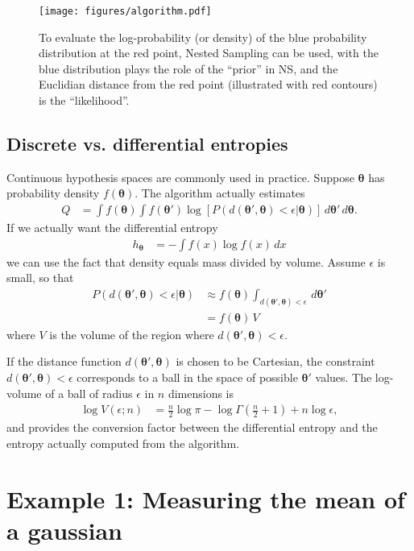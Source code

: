 \documentclass[entropy,article,accept,oneauthor,pdftex,10pt,a4paper]{mdpi}
\newcommand{\x}{\boldsymbol{\theta}}
\begin{document}
\begin{figure}[!ht]
\centering
\texttt{[image: figures/algorithm.pdf]}
\caption{To evaluate the log-probability (or density) of the blue
probability distribution at the red point, Nested Sampling can be used,
with the blue distribution plays the role of the ``prior'' in NS, and the
Euclidian distance from the red point (illustrated with red contours)
is the ``likelihood''.\label{fig:algorithm}}
\end{figure}


\subsection{Discrete vs. differential entropies}

Continuous hypothesis spaces are commonly used in practice. Suppose
$\x$ has probability density $f(\x)$. The algorithm actually estimates
\begin{align}
Q &= \int f(\x) \int f(\x')
            \log \left[ P(d(\x', \x) < \epsilon | \x) \right]
                        \, d\x' \, d\x.
\end{align}
If we actually want the differential
entropy
\begin{align}
h_{\x} &= -\int f(x) \log f(x) \, dx
\end{align}
we can use the fact that density equals mass divided
by volume. Assume $\epsilon$ is small, so that
\begin{align}
P(d(\x', \x) < \epsilon | \x)
    &\approx
    f(\x) \int_{d(\x', \x) < \epsilon} \, d\x'\\
    &= f(\x) \, V
\end{align}
where $V$ is the volume of the region where $d(\x', \x) < \epsilon$.

If the distance function $d(\x', \x)$ is chosen to be Cartesian,
the constraint $d(\x', \x) < \epsilon$ corresponds to a ball in the space
of possible $\x'$ values.
The log-volume of a ball of radius $\epsilon$ in $n$ dimensions is
\begin{align}
\log V(\epsilon; n) &= \frac{n}{2}\log \pi
                        - \log \Gamma\left(\frac{n}{2} + 1\right)
                        + n \log \epsilon,
\end{align}
and provides the conversion factor between the differential entropy and
the entropy actually computed from the algorithm.


\section{Example 1: Measuring the mean of a gaussian}
\end{document}
